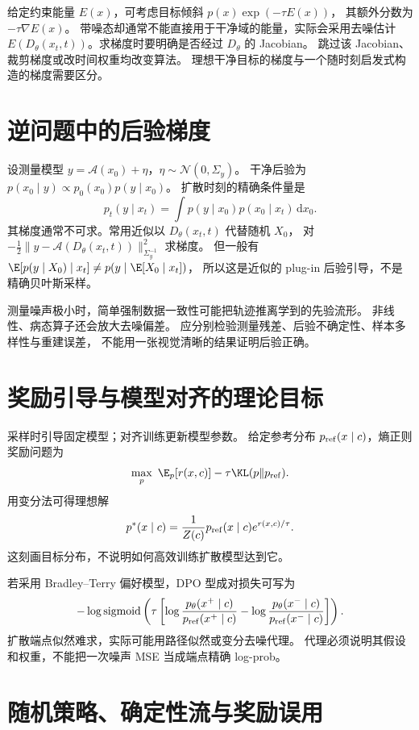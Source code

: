 给定约束能量 $E(x)$，可考虑目标倾斜 $p(x)\exp(-\tau E(x))$，
其额外分数为 $-\tau\nabla E(x)$。
带噪态却通常不能直接用于干净域的能量，实际会采用去噪估计
$E(D_\theta(x_t,t))$。求梯度时要明确是否经过 $D_\theta$ 的 Jacobian。
跳过该 Jacobian、裁剪梯度或改时间权重均改变算法。
理想干净目标的梯度与一个随时刻启发式构造的梯度需要区分。

\section{逆问题中的后验梯度}

设测量模型 $y=\mathcal A(x_0)+\eta$，$\eta\sim\mathcal N(0,\Sigma_y)$。
干净后验为 $p(x_0\mid y)\propto p_0(x_0)p(y\mid x_0)$。
扩散时刻的精确条件量是
\begin{equation}\label{th:inverse-likelihood}
p_t(y\mid x_t)=\int p(y\mid x_0)p(x_0\mid x_t)\,\mathrm dx_0.
\end{equation}
其梯度通常不可求。常用近似以 $D_\theta(x_t,t)$ 代替随机 $X_0$，
对 $-\frac12\|y-\mathcal A(D_\theta(x_t,t))\|^2_{\Sigma_y^{-1}}$ 求梯度。
但一般有
$\E[p(y\mid X_0)\mid x_t]\ne p(y\mid\E[X_0\mid x_t])$，
所以这是近似的 plug-in 后验引导，不是精确贝叶斯采样。

测量噪声极小时，简单强制数据一致性可能把轨迹推离学到的先验流形。
非线性、病态算子还会放大去噪偏差。
应分别检验测量残差、后验不确定性、样本多样性与重建误差，
不能用一张视觉清晰的结果证明后验正确。

\section{奖励引导与模型对齐的理论目标}

采样时引导固定模型；对齐训练更新模型参数。
给定参考分布 $p_{\rm ref}(x\mid c)$，熵正则奖励问题为
\[
\max_p\ \E_p[r(x,c)]-\tau\KL(p\Vert p_{\rm ref}).
\]
用变分法可得理想解
\begin{equation}\label{th:reward-tilt}
p^*(x\mid c)=\frac1{Z(c)}p_{\rm ref}(x\mid c)e^{r(x,c)/\tau}.
\end{equation}
这刻画目标分布，不说明如何高效训练扩散模型达到它。

若采用 Bradley--Terry 偏好模型，DPO 型成对损失可写为
\[
-\log\operatorname{sigmoid}\left(
 \tau\left[\log\frac{p_\theta(x^+\mid c)}{p_{\rm ref}(x^+\mid c)}
 -\log\frac{p_\theta(x^-\mid c)}{p_{\rm ref}(x^-\mid c)}\right]\right).
\]
扩散端点似然难求，实际可能用路径似然或变分去噪代理。
代理必须说明其假设和权重，不能把一次噪声 MSE 当成端点精确 log-prob。

\section{随机策略、确定性流与奖励误用}


